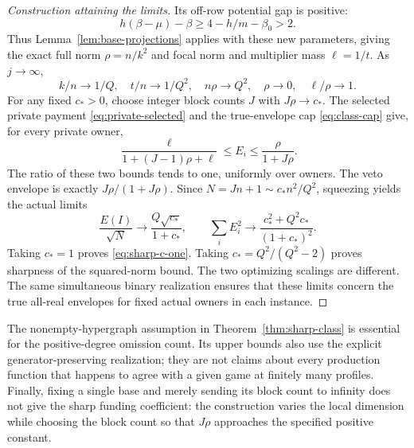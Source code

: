 \begin{proof}[Construction attaining the limits]
Its off-row potential gap is positive:
\[
 h(\beta-\mu)-\beta
       \ge4-h/m-\beta_0>2.
\]
Thus Lemma~\ref{lem:base-projections} applies with these new parameters,
giving the exact full norm $\rho=n/k^2$ and focal norm and multiplier
mass $\ell=1/t$.  As $j\to\infty$,
\[
 k/n\longrightarrow1/Q,\quad t/n\longrightarrow1/Q^2,\quad
 n\rho\longrightarrow Q^2,\quad \rho\longrightarrow0,\quad
 \ell/\rho\longrightarrow1.
\]
For any fixed $c_*>0$, choose integer block counts $J$ with
$J\rho\to c_*$.  The selected private payment
\eqref{eq:private-selected} and the true-envelope cap
\eqref{eq:class-cap} give, for every private owner,
\[
 \frac{\ell}{1+(J-1)\rho+\ell}
       \le E_i\le\frac{\rho}{1+J\rho}.
\]
The ratio of these two bounds tends to one, uniformly over owners.
The veto envelope is exactly $J\rho/(1+J\rho)$.
Since $N=Jn+1\sim c_*n^2/Q^2$, squeezing yields the actual limits
\[
 \frac{E(I)}{\sqrt N}\longrightarrow
         \frac{Q\sqrt{c_*}}{1+c_*},\qquad
 \sum_i E_i^2\longrightarrow
         \frac{c_*^2+Q^2c_*}{(1+c_*)^2}.
\]
Taking $c_*=1$ proves \eqref{eq:sharp-c-one}.  Taking
$c_*=Q^2/(Q^2-2)$ proves sharpness of the squared-norm bound.
The two optimizing scalings are different.  The same simultaneous
binary realization ensures that these limits concern the true
all-real envelopes for fixed actual owners in each instance.
\end{proof}

The nonempty-hypergraph assumption in Theorem~\ref{thm:sharp-class} is
essential for the positive-degree omission count.  Its upper bounds
also use the explicit generator-preserving realization; they are not
claims about every production function that happens to agree with a
given game at finitely many profiles.  Finally, fixing a single base
and merely sending its block count to infinity does not give the sharp
funding coefficient: the construction varies the local dimension while
choosing the block count so that $J\rho$ approaches the specified
positive constant.
